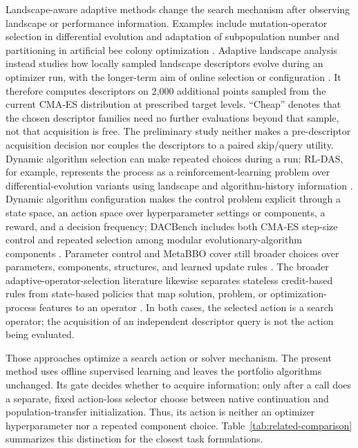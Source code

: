 Landscape-aware adaptive methods change the search mechanism after observing
landscape or performance information.  Examples include mutation-operator
selection in differential evolution and adaptation of subpopulation number and
partitioning in artificial bee colony optimization
\cite{sallamLandscapebasedAdaptiveOperator2017,zhouAdaptiveMultipopulationArtificial2024}.
Adaptive landscape analysis instead studies how locally sampled landscape
descriptors evolve during an optimizer run, with the longer-term aim of online
selection or configuration \cite{jankovicAdaptiveLandscapeAnalysis2019a}.  It
therefore computes descriptors on 2,000 additional points sampled from the
current CMA-ES distribution at prescribed target levels.  ``Cheap'' denotes
that the chosen descriptor families need no further evaluations beyond that
sample, not that acquisition is free.  The preliminary study neither makes a
pre-descriptor acquisition decision nor couples the descriptors to a paired
skip/query utility.
Dynamic algorithm selection can make repeated choices during a run; RL-DAS, for
example, represents the process as a reinforcement-learning problem over
differential-evolution variants using landscape and algorithm-history
information \cite{guoDeepReinforcementLearning2024b}.  Dynamic algorithm
configuration makes the control problem explicit through a state space, an
action space over hyperparameter settings or components, a reward, and a
decision frequency; DACBench includes both CMA-ES step-size control and repeated
selection among modular evolutionary-algorithm components
\cite{eimerDACBenchBenchmarkLibrary2021}.  Parameter control and MetaBBO cover
still broader choices over parameters, components, structures, and learned
update rules
\cite{gomespereiradelacerdaSystematicLiteratureReview2021,yangMetablackboxOptimizationEvolutionary2025}.
The broader adaptive-operator-selection literature likewise separates
stateless credit-based rules from state-based policies that map solution,
problem, or optimization-process features to an operator
\cite{peiAdaptiveOperatorSelection2025}.  In both cases, the selected action is
a search operator; the acquisition of an independent descriptor query is not
the action being evaluated.

Those approaches optimize a search action or solver mechanism.  The present
method uses offline supervised learning and leaves the portfolio algorithms
unchanged.  Its gate decides whether to acquire information; only after a call
does a separate, fixed action-loss selector choose between native continuation
and population-transfer initialization.  Thus, its action is neither an
optimizer hyperparameter nor a repeated component choice.  Table~\ref{tab:related-comparison}
summarizes this distinction for the closest task formulations.

